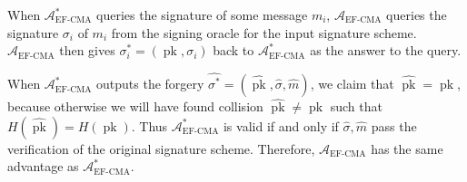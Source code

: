 \documentclass{article}
\newcommand{\adv}{\mathcal{A}_\text{EF-CMA}}
\begin{document}
When $\adv^\ast$ queries the signature of some message $m_i$, $\adv$ queries the signature $\sigma_i$ of $m_i$ from the signing oracle for the input signature scheme. $\adv$ then gives $\sigma^\ast_i = (\operatorname{pk}, \sigma_i)$ back to $\adv^\ast$ as the answer to the query.

When $\adv^\ast$ outputs the forgery $\hat{\sigma^\ast} = (\hat{\operatorname{pk}}, \hat{\sigma}, \hat{m})$, we claim that $\hat{\operatorname{pk}} = \operatorname{pk}$, because otherwise we will have found collision $\hat{\operatorname{pk}} \neq \operatorname{pk}$ such that $H(\hat{\operatorname{pk}}) = H(\operatorname{pk})$. Thus $\adv^\ast$ is valid if and only if $\hat{\sigma}, \hat{m}$ pass the verification of the original signature scheme. Therefore, $\adv$ has the same advantage as $\adv^\ast$.
\end{document}
